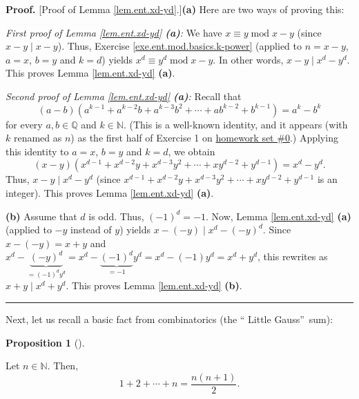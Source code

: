 \documentclass[numbers=enddot,12pt,final,onecolumn,notitlepage]{scrartcl}%
\numberwithin{exer}{subsection}
\theoremstyle{definition}
\newtheorem{prop}[theo]{Proposition}
\newenvironment{proposition}[1][]
{\begin{prop}[#1]\begin{leftbar}}
{\end{leftbar}\end{prop}}
\newenvironment{proof}[1][Proof]{\noindent\textbf{#1.} }{\ \rule{0.5em}{0.5em}}
\begin{document}
\begin{proof}
[Proof of Lemma \ref{lem.ent.xd-yd}.]\textbf{(a)} Here are two ways of proving this:

\textit{First proof of Lemma \ref{lem.ent.xd-yd} \textbf{(a)}:} We have
$x\equiv y\operatorname{mod}x-y$ (since $x-y\mid x-y$). Thus, Exercise
\ref{exe.ent.mod.basics.k-power} (applied to $n=x-y$, $a=x$, $b=y$ and $k=d$)
yields $x^{d}\equiv y^{d}\operatorname{mod}x-y$. In other words, $x-y\mid
x^{d}-y^{d}$. This proves Lemma \ref{lem.ent.xd-yd} \textbf{(a)}.

\textit{Second proof of Lemma \ref{lem.ent.xd-yd} \textbf{(a)}:} Recall that%
\begin{equation}
\left(  a-b\right)  \left(  a^{k-1}+a^{k-2}b+a^{k-3}b^{2}+\cdots
+ab^{k-2}+b^{k-1}\right)  =a^{k}-b^{k} \label{pf.lem.ent.xd-yd.1}%
\end{equation}
for every $a,b\in\mathbb{Q}$ and $k\in\mathbb{N}$. (This is a well-known
identity, and it appears (with $k$ renamed as $n$) as the first half of
Exercise 1 on
\href{http://www-users.math.umn.edu/~dgrinber/19s/hw0s.pdf}{homework set
\#0}.) Applying this identity to $a=x$, $b=y$ and $k=d$, we obtain%
\[
\left(  x-y\right)  \left(  x^{d-1}+x^{d-2}y+x^{d-3}y^{2}+\cdots
+xy^{d-2}+y^{d-1}\right)  =x^{d}-y^{d}.
\]
Thus, $x-y\mid x^{d}-y^{d}$ (since $x^{d-1}+x^{d-2}y+x^{d-3}y^{2}%
+\cdots+xy^{d-2}+y^{d-1}$ is an integer). This proves Lemma
\ref{lem.ent.xd-yd} \textbf{(a)}.

\textbf{(b)} Assume that $d$ is odd. Thus, $\left(  -1\right)  ^{d}=-1$. Now,
Lemma \ref{lem.ent.xd-yd} \textbf{(a)} (applied to $-y$ instead of $y$) yields
$x-\left(  -y\right)  \mid x^{d}-\left(  -y\right)  ^{d}$. Since $x-\left(
-y\right)  =x+y$ and $x^{d}-\underbrace{\left(  -y\right)  ^{d}}_{=\left(
-1\right)  ^{d}y^{d}}=x^{d}-\underbrace{\left(  -1\right)  ^{d}}_{=-1}%
y^{d}=x^{d}-\left(  -1\right)  y^{d}=x^{d}+y^{d}$, this rewrites as $x+y\mid
x^{d}+y^{d}$. This proves Lemma \ref{lem.ent.xd-yd} \textbf{(b)}.
\end{proof}

Next, let us recall a basic fact from combinatorics (the \textquotedblleft
Little Gauss\textquotedblright\ sum):

\begin{proposition}
\label{prop.ent.1+2+...+n}Let $n\in\mathbb{N}$. Then,
\[
1+2+\cdots+n=\dfrac{n\left(  n+1\right)  }{2}.
\]

\end{proposition}
\end{document}
